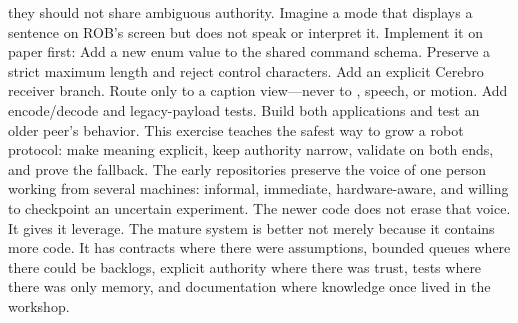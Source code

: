 {}they should not share ambiguous authority.\markdownRendererInterblockSeparator
{}
\markdownRendererSectionEnd \markdownRendererSectionBegin
{}\markdownRendererInterblockSeparator
{}Imagine a  mode that displays a sentence on ROB's screen but does\markdownRendererSoftLineBreak
{}not speak or interpret it. Implement it on paper first:\markdownRendererInterblockSeparator
{}\markdownRendererOlBegin
{}Add a new enum value to the shared command schema.\markdownRendererOlItemEnd 
{}Preserve a strict maximum length and reject control characters.\markdownRendererOlItemEnd 
{}Add an explicit Cerebro receiver branch.\markdownRendererOlItemEnd 
{}Route only to a caption view—never to , speech, or motion.\markdownRendererOlItemEnd 
{}Add encode/decode and legacy-payload tests.\markdownRendererOlItemEnd 
{}Build both applications and test an older peer's behavior.\markdownRendererOlItemEnd 
\markdownRendererOlEnd \markdownRendererInterblockSeparator
{}This exercise teaches the safest way to grow a robot protocol: make meaning\markdownRendererSoftLineBreak
{}explicit, keep authority narrow, validate on both ends, and prove the fallback.\markdownRendererInterblockSeparator
{}\markdownRendererThematicBreak{}\markdownRendererInterblockSeparator
{}
\markdownRendererSectionEnd 
\markdownRendererSectionEnd \markdownRendererSectionBegin
{}\markdownRendererInterblockSeparator
{}The early repositories preserve the voice of one person working from several\markdownRendererSoftLineBreak
{}machines: informal, immediate, hardware-aware, and willing to checkpoint an\markdownRendererSoftLineBreak
{}uncertain experiment. The newer code does not erase that voice. It gives it\markdownRendererSoftLineBreak
{}leverage.\markdownRendererParagraphSeparator
{}The mature system is better not merely because it contains more code. It has\markdownRendererSoftLineBreak
{}contracts where there were assumptions, bounded queues where there could be\markdownRendererSoftLineBreak
{}backlogs, explicit authority where there was trust, tests where there was only\markdownRendererSoftLineBreak
{}memory, and documentation where knowledge once lived in the workshop.\markdownRendererParagraphSeparator

